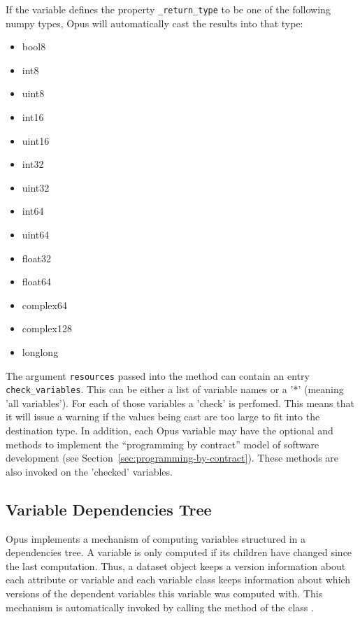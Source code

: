If the variable defines the property \verb|_return_type| to be one of the
following numpy types, Opus will automatically cast the results into that
type: 
\begin{itemize}
\tight
\item bool8
\item int8
\item uint8
\item int16
\item uint16
\item int32
\item uint32
\item int64
\item uint64
\item float32
\item float64
\item complex64
\item complex128
\item longlong
\end{itemize}
The argument \verb|resources| passed into the  method can 
contain an entry \verb|check_variables|. This can be either a list of variable names or a '*' (meaning 'all variables').
For each of those variables a 'check' is perfomed.
This means that it will issue a warning if
the values being cast are too large to fit into the destination type.
In addition, each Opus variable may have the optional  and
 methods to implement the ``programming by contract''
 model of software development (see
Section~\ref{sec:programming-by-contract}). These methods are also invoked on the 'checked' variables. 

\subsection{Variable Dependencies Tree}
\label{sec:dependencies-tree}

%
Opus implements a mechanism of computing variables structured in a
dependencies tree. A variable is only computed if its children have changed
since the last computation. Thus, a dataset object keeps a version information
about each attribute or variable and each variable class keeps information
about which versions of the dependent variables this variable was
computed with. This mechanism is automatically invoked by calling the method
 of the class . 

